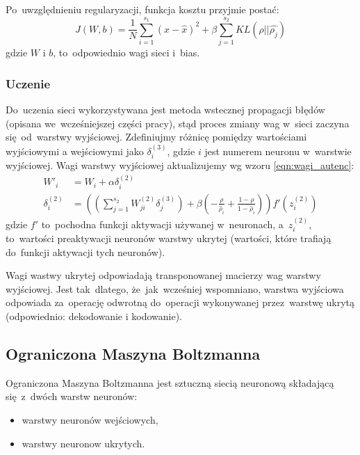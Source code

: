 Po~uwzględnieniu regularyzacji, funkcja kosztu przyjmie postać:
\begin{equation*}
J(W,b)=\frac{1}{N}\sum\limits_{i=1}^{s_1}(x-\hat{x})^2 + \beta\sum\limits_{j=1}^{s_2}KL(\rho||\hat{\rho_j})
\end{equation*}
gdzie $W$ i $b$, to~odpowiednio wagi sieci i~bias.

\subsubsection{Uczenie}
Do~uczenia sieci wykorzystywana jest metoda wstecznej propagacji błędów (opisana we~wcześniejszej części pracy),
stąd proces zmiany wag w~sieci zaczyna się~od~warstwy wyjściowej. Zdefiniujmy różnicę pomiędzy wartościami wyjściowymi
a wejściowymi jako $\delta_i^{(3)}$, gdzie $i$ jest numerem neuronu w~warstwie wyjściowej.
Wagi warstwy wyjściowej aktualizujemy wg wzoru \ref{eqn:wagi_autenc}:
\begin{equation}
    \begin{split}
    W'_i &= W_i + \alpha\delta^{(2)}_i \\
    \delta_i^{(2)} &= \left( \left( \sum\limits_{j=1}^{s_{2}} W^{(2)}_{ji} \delta^{(3)}_j \right)
    + \beta \left( - \frac{\rho}{\hat\rho_i} + \frac{1-\rho}{1-\hat\rho_i} \right) \right) f'(z^{(2)}_i)
    \end{split}
    \label{eqn:wagi_autenc}
\end{equation}
gdzie $f'$ to~pochodna funkcji aktywacji używanej w~neuronach, a~$z^{(2)}_i$, to~wartości preaktywacji neuronów warstwy
ukrytej (wartości, które trafiają do~funkcji aktywacji tych neuronów).

Wagi wastwy ukrytej odpowiadają transponowanej macierzy wag warstwy wyjściowej. Jest tak~dlatego, że~jak~wcześniej
wspomniano, warstwa wyjściowa odpowiada za~operację odwrotną do~operacji wykonywanej przez~warstwę ukrytą (odpowiednio:
dekodowanie i kodowanie).

\subsection{Ograniczona Maszyna Boltzmanna}
Ograniczona Maszyna Boltzmanna jest sztuczną siecią neuronową składającą się~z~dwóch warstw neuronów:
\begin{itemize}
  \item warstwy neuronów wejściowych,
  \item warstwy neuronow ukrytych.
\end{itemize}


